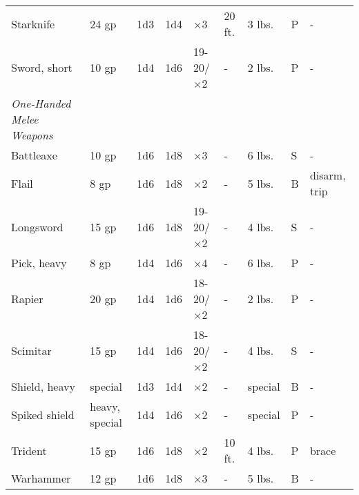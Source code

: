 \begin{table*}[]
\begin{tabular}{lllllllll}
 Starknife & 24 gp & 1d3 & 1d4 & $\times$3 & 20 ft. & 3 lbs. & P & - \\
 Sword, short & 10 gp & 1d4 & 1d6 & 19-20/$\times$2 & - & 2 lbs. & P & - \\
 \textit{One-Handed Melee Weapons} \\
 Battleaxe & 10 gp & 1d6 & 1d8 & $\times$3 & - & 6 lbs. & S & - \\
 Flail & 8 gp & 1d6 & 1d8 & $\times$2 & - & 5 lbs. & B & disarm, trip \\
 Longsword & 15 gp & 1d6 & 1d8 & 19-20/$\times$2 & - & 4 lbs. & S & - \\
 Pick, heavy & 8 gp & 1d4 & 1d6 & $\times$4 & - & 6 lbs. & P & - \\
 Rapier & 20 gp & 1d4 & 1d6 & 18-20/$\times$2 & - & 2 lbs. & P & - \\
 Scimitar & 15 gp & 1d4 & 1d6 & 18-20/$\times$2 & - & 4 lbs. & S & - \\
 Shield, heavy & special & 1d3 & 1d4 & $\times$2 & - & special & B & - \\
 Spiked shield & heavy, special & 1d4 & 1d6 & $\times$2 & - & special & P & - \\
 Trident & 15 gp & 1d6 & 1d8 & $\times$2 & 10 ft. & 4 lbs. & P & brace \\
 Warhammer & 12 gp & 1d6 & 1d8 & $\times$3 & - & 5 lbs. & B & - \\
 \end{tabular}
 \end{table*}
 
